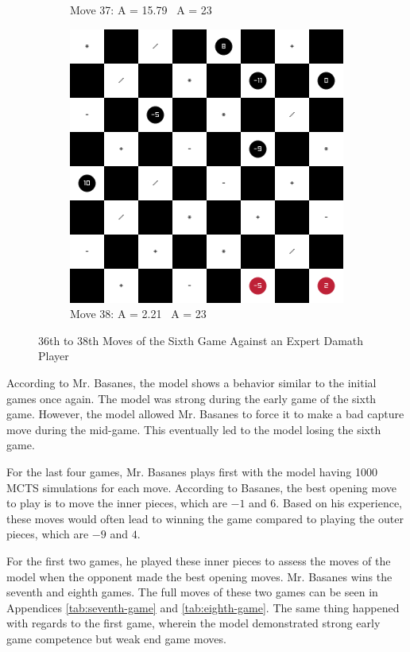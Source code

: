 \begin{figure}[H]
\begin{subfigure}{0.3\textwidth}
        \caption*{Move 37: A = 15.79 \textbar\ A = 23}
    \end{subfigure}
    \quad
    \begin{subfigure}{0.3\textwidth}
        \centering
        \includegraphics[width=\textwidth]{images/games/game6/move_38.png}
        \caption*{Move 38: A = 2.21 \textbar\ A = 23}
    \end{subfigure}
    \caption{36th to 38th Moves of the Sixth Game Against an Expert Damath Player}
    \label{fig:36-38-game6}
\end{figure}

According to Mr. Basanes, the model shows a behavior similar to the initial games once again. The model was strong during the early game of the sixth game. However, the model allowed Mr. Basanes to force it to make a bad capture move during the mid-game. This eventually led to the model losing the sixth game.

For the last four games, Mr. Basanes plays first with the model having 1000 MCTS simulations for each move. According to Basanes, the best opening move to play is to move the inner pieces, which are $-1$ and $6$. Based on his experience, these moves would often lead to winning the game compared to playing the outer pieces, which are $-9$ and $4$.

For the first two games, he played these inner pieces to assess the moves of the model when the opponent made the best opening moves. Mr. Basanes wins the seventh and eighth games. The full moves of these two games can be seen in Appendices \ref{tab:seventh-game} and \ref{tab:eighth-game}. The same thing happened with regards to the first game, wherein the model demonstrated strong early game competence but weak end game moves. 

